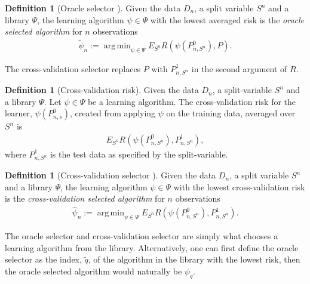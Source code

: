 \documentclass[11pt, a4paper]{article}
\DeclareMathOperator*{\argmin}{arg\,min}
\theoremstyle{definition}
\newtheorem{definition}[theorem]{Definition}
\theoremstyle{remark}
\newcommand{\q}{q}
\newcommand{\btheta}{\theta}
\newcommand{\la}{\psi}
\newcommand{\Sn}{S^n}
\newcommand{\lib}{\Psi}
\begin{document}
\begin{definition}[Oracle selector \parencite{laan03}]
    Given the data $ D_n $, a split variable $ \Sn $ and a library $ \lib $, the learning algorithm $ \la \in \lib $ with the lowest averaged risk is the \textit{oracle selected algorithm} for $ n $ observations
    \begin{align*}
        \tilde{\la}_n := \argmin_{\la \in \lib} E_{\Sn} R(\la(P_{n,\Sn}^0 ) , P).
    \end{align*}
\end{definition}
The cross-validation selector replaces $ P $ with $ P_{n, \Sn}^{1} $ in the second argument of $ R $.
\begin{definition}[Cross-validation risk]
     Given the data $D_n$, a split-variable $\Sn$ and a library $ \lib $. Let $ \la \in \lib $ be a learning algorithm. The cross-validation risk for the learner, $\la(P_{n,s}^0)$, created from applying $ \la $ on the training data, averaged over $ \Sn $ is  
    \begin{align*}
        E_{\Sn} R( \la(P_{n,\Sn}^{0}), P_{n, \Sn}^{1}),
    \end{align*}
    where $ P_{n,\Sn}^{1} $ is the test data as specified by the split-variable.
\end{definition}

\begin{definition}[Cross-validation selector \parencite{laan03}] \label{def:cvselector}
    Given the data $ D_n $, a split variable $ \Sn $ and a library $ \lib $, the learning algorithm $ \la \in \lib $ with the lowest cross-validation risk is the \textit{cross-validation selected algorithm} for $ n $ observations
    \begin{align*}
        \hat{\la}_n := \argmin_{\la \in \lib} E_{\Sn} R(\la(P_{n,\Sn}^0 ) , P_{n, \Sn}^{1}).
    \end{align*}
\end{definition}
%
The oracle selector and cross-validation selector are simply what chooses a learning algorithm from the library. Alternatively, one can first define the oracle selector as the index, $ \tilde{\q} $, of the algorithm in the library with the lowest risk, then the oracle selected algorithm would naturally be $ \la_{ \tilde{\q} } $. 
\end{document}
